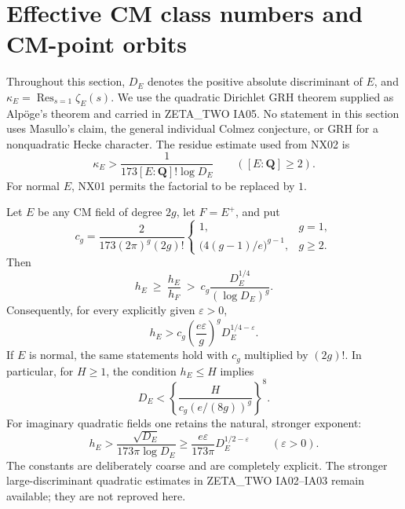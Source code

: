 
\section{Effective CM class numbers and CM-point orbits}

Throughout this section, $D_E$ denotes the positive absolute discriminant of
$E$, and $\kappa_E=\operatorname*{Res}_{s=1}\zeta_E(s)$.
We use the quadratic Dirichlet GRH theorem supplied as Alp\"oge's theorem
and carried in ZETA\_TWO IA05.  No statement in this section uses Masullo's
claim, the general individual Colmez conjecture, or GRH for a nonquadratic
Hecke character.  The residue estimate used from NX02 is
\begin{equation}\label{eq:NC-residue-input}
 \kappa_E>\frac{1}{173[ E:\mathbf Q]!\log D_E}
 \qquad([E:\mathbf Q]\geq2).
\end{equation}
For normal $E$, NX01 permits the factorial to be replaced by $1$.

\begin{theorem}
\label{NC01}
Let $E$ be any CM field of degree $2g$, let $F=E^+$, and put
\[
 c_g=\frac{2}{173(2\pi)^g(2g)!}
       \begin{cases}
       1,&g=1,\\
       \bigl(4(g-1)/e\bigr)^{g-1},&g\geq2.
       \end{cases}
\]
Then
\begin{equation}\label{eq:NC01-log}
 h_E\ \geq\ \frac{h_E}{h_F}\ >\
 c_g\frac{D_E^{1/4}}{(\log D_E)^g}.
\end{equation}
Consequently, for every explicitly given $\varepsilon>0$,
\begin{equation}\label{eq:NC01-epsilon}
 h_E>c_g\left(\frac{e\varepsilon}{g}\right)^g
                 D_E^{1/4-\varepsilon}.
\end{equation}
If $E$ is normal, the same statements hold with $c_g$ multiplied by
$(2g)!$.  In particular, for $H\geq1$, the condition $h_E\leq H$ implies
\begin{equation}\label{eq:NC01-cutoff}
 D_E<\left\{\frac{H}{c_g(e/(8g))^g}\right\}^{8}.
\end{equation}
For imaginary quadratic fields one retains the natural, stronger exponent:
\begin{equation}\label{eq:NC01-quadratic}
 h_E>\frac{\sqrt{D_E}}{173\pi\log D_E}
 \geq\frac{e\varepsilon}{173\pi}D_E^{1/2-\varepsilon}
 \qquad(\varepsilon>0).
\end{equation}
The constants are deliberately coarse and are completely explicit.
The stronger large-discriminant quadratic estimates in
ZETA\_TWO IA02--IA03 remain available; they are not reproved here.
\end{theorem}

